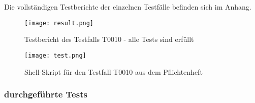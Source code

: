 \documentclass[11pt,a4paper]{scrartcl}
\begin{document}
Die vollständigen Testberichte der einzelnen Testfälle befinden sich im Anhang.

\begin{figure}[H]
	\centering
	\texttt{[image: result.png]}
	\caption{Testbericht des Testfalls T0010 - alle Tests sind erfüllt}	
\end{figure}

\begin{figure}[H]
	\centering
	\texttt{[image: test.png]}
	\caption{Shell-Skript für den Testfall T0010 aus dem Pflichtenheft}	
\end{figure}


\subsubsection{durchgeführte Tests}
\end{document}
